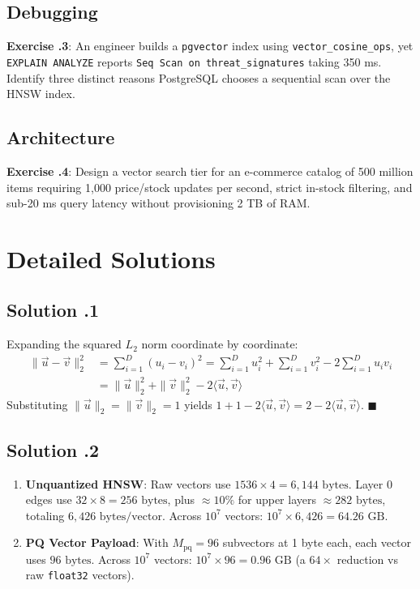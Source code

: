 \subsection*{Debugging}
\textbf{Exercise \thechapter.3}: An engineer builds a \texttt{pgvector} index using \texttt{vector\_cosine\_ops}, yet \texttt{EXPLAIN ANALYZE} reports \texttt{Seq Scan on threat\_signatures} taking 350 ms. Identify three distinct reasons PostgreSQL chooses a sequential scan over the HNSW index.

\subsection*{Architecture}
\textbf{Exercise \thechapter.4}: Design a vector search tier for an e-commerce catalog of 500 million items requiring 1,000 price/stock updates per second, strict in-stock filtering, and sub-20 ms query latency without provisioning 2 TB of RAM.

\section{Detailed Solutions}

\subsection*{Solution \thechapter.1}
Expanding the squared $L_2$ norm coordinate by coordinate:
\begin{align*}
\|\vec{u} - \vec{v}\|_2^2 &= \sum_{i=1}^D (u_i - v_i)^2 = \sum_{i=1}^D u_i^2 + \sum_{i=1}^D v_i^2 - 2\sum_{i=1}^D u_i v_i \\
&= \|\vec{u}\|_2^2 + \|\vec{v}\|_2^2 - 2\langle \vec{u}, \vec{v} \rangle
\end{align*}
Substituting $\|\vec{u}\|_2 = \|\vec{v}\|_2 = 1$ yields $1 + 1 - 2\langle \vec{u}, \vec{v} \rangle = 2 - 2\langle \vec{u}, \vec{v} \rangle$. $\blacksquare$

\subsection*{Solution \thechapter.2}
\begin{enumerate}
  \item \textbf{Unquantized HNSW}: Raw vectors use $1536 \times 4 = 6{,}144\text{ bytes}$. Layer 0 edges use $32 \times 8 = 256\text{ bytes}$, plus $\approx 10\%$ for upper layers $\approx 282\text{ bytes}$, totaling $6{,}426\text{ bytes/vector}$. Across $10^7$ vectors: $10^7 \times 6{,}426 = 64.26\text{ GB}$.
  \item \textbf{PQ Vector Payload}: With $M_{\text{pq}} = 96$ subvectors at 1 byte each, each vector uses $96\text{ bytes}$. Across $10^7$ vectors: $10^7 \times 96 = 0.96\text{ GB}$ (a $64\times$ reduction vs raw \texttt{float32} vectors).
\end{enumerate}


